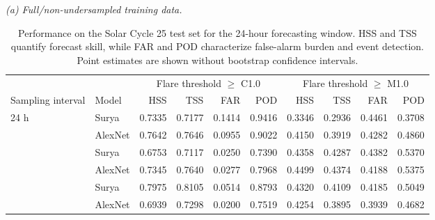 \begin{table}[t]
\centering
\caption{Performance on the Solar Cycle 25 test set for the 24-hour forecasting window. HSS and TSS quantify forecast skill, while FAR and POD characterize false-alarm burden and event detection. Point estimates are shown without bootstrap confidence intervals.}
\label{tab:test-24h}
\small
\textit{(a) Full/non-undersampled training data.}\\[2pt]
\begin{tabular}{llrrrr rrrr}
\toprule
& & \multicolumn{4}{c}{Flare threshold $\geq$ C1.0} & \multicolumn{4}{c}{Flare threshold $\geq$ M1.0} \\
\cmidrule(lr){3-6}\cmidrule(lr){7-10}
Sampling interval & Model & HSS & TSS & FAR & POD & HSS & TSS & FAR & POD \\
\midrule
\multirow{2}{*}{24 h}
  & Surya & 0.7335 & 0.7177 & 0.1414 & 0.9416 & 0.3346 & 0.2936 & 0.4461 & 0.3708 \\
  & AlexNet & 0.7642 & 0.7646 & 0.0955 & 0.9022 & 0.4150 & 0.3919 & 0.4282 & 0.4860 \\
\addlinespace
\multirow{2}{*}{12 h}
  & Surya & 0.6753 & 0.7117 & 0.0250 & 0.7390 & 0.4358 & 0.4287 & 0.4382 & 0.5370 \\
  & AlexNet & 0.7345 & 0.7640 & 0.0277 & 0.7968 & 0.4499 & 0.4374 & 0.4188 & 0.5375 \\
\addlinespace
\multirow{2}{*}{8 h}
  & Surya & 0.7975 & 0.8105 & 0.0514 & 0.8793 & 0.4320 & 0.4109 & 0.4185 & 0.5049 \\
  & AlexNet & 0.6939 & 0.7298 & 0.0200 & 0.7519 & 0.4254 & 0.3895 & 0.3939 & 0.4682 \\
\bottomrule
\end{tabular}


\end{table}

